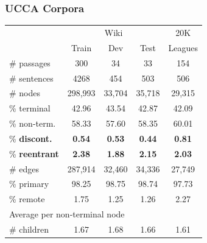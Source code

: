 \documentclass[t]{beamer}
\begin{document}
\begin{frame}
\frametitle{UCCA Corpora}
\centering
	\begin{tabular}{l|ccc|c}
		& \multicolumn{3}{c|}{Wiki} & 20K \\
		& \small Train & \small Dev & \small Test & Leagues \\
		\hline
		\# passages & 300 & 34 & 33 & 154 \\
		\# sentences & 4268 & 454 & 503 & 506 \\
		\hline
		\# nodes & 298,993 & 33,704 & 35,718 & 29,315 \\
		\% terminal & 42.96 & 43.54 & 42.87 & 42.09 \\
		\% non-term. & 58.33 & 57.60 & 58.35 & 60.01 \\
		\% \textbf{discont.} & \textbf{0.54} & \textbf{0.53} & \textbf{0.44} & \textbf{0.81} \\
		\% \textbf{reentrant} & \textbf{2.38} & \textbf{1.88} & \textbf{2.15} & \textbf{2.03} \\
		\hline
		\# edges & 287,914 & 32,460 & 34,336 & 27,749 \\
		\% primary & 98.25 & 98.75 & 98.74 & 97.73 \\
		\% remote & 1.75 & 1.25 & 1.26 & 2.27 \\
		\hline
		\multicolumn{3}{l}{\footnotesize Average per non-terminal node} \\
		\# children & 1.67 & 1.68 & 1.66 & 1.61 
	\end{tabular}
\end{frame}
\end{document}
